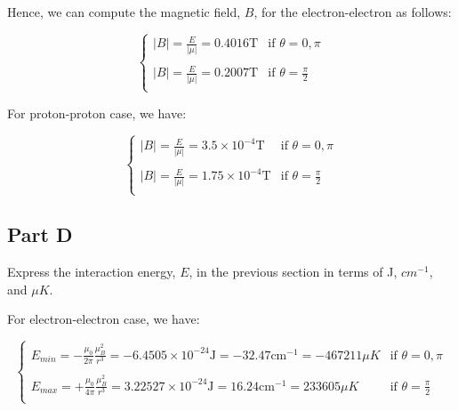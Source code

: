 \documentclass[11pt]{article}
\begin{document}
  Hence, we can compute the magnetic field, $B$, for the electron-electron as follows:

  \begin{equation}
    \begin{cases}
      \displaystyle
      |B| = \frac{E}{|\mu|} = 0.4016 \text{T} & \text{if } \theta = 0, \pi \\
      \\
      \displaystyle
      |B| = \frac{E}{|\mu|} = 0.2007 \text{T} & \text{if } \theta = \frac{\pi}{2}\\
    \end{cases}
  \end{equation}

  For proton-proton case, we have:

  \begin{equation}
    \begin{cases}
      \displaystyle
      |B| = \frac{E}{|\mu|} = 3.5 \times 10^{-4} \text{T} & \text{if } \theta = 0, \pi \\
      \\
      \displaystyle
      |B| = \frac{E}{|\mu|} = 1.75 \times 10^{-4} \text{T} & \text{if } \theta = \frac{\pi}{2}\\
    \end{cases}
  \end{equation}

  \subsection{Part D}

  Express the interaction energy, $E$, in the previous section in terms of J, $cm^{-1}$, and $\mu K$.

  For electron-electron case, we have:

  \begin{equation}
    \begin{cases}
      \displaystyle
      E_{min} = -\frac{\mu_0}{2\pi} \frac{\mu_B^2}{r^3} = - 6.4505 \times 10^{-24} \text{J} = - 32.47 \text{cm}^{-1} = - 467211 \mu K & \text{if } \theta = 0, \pi \\
      \\
      \displaystyle
      E_{max} = +\frac{\mu_0}{4\pi} \frac{\mu_B^2}{r^3} = 3.22527 \times 10^{-24} \text{J} = 16.24 \text{cm}^{-1} = 233605 \mu K & \text{if } \theta = \frac{\pi}{2}\\
    \end{cases}
  \end{equation}
\end{document}
